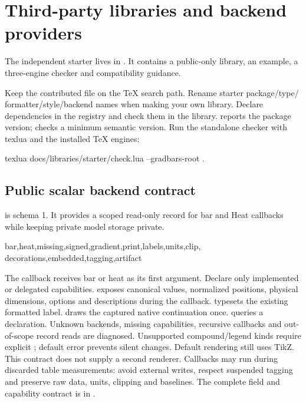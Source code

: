 \section{Third-party libraries and backend providers}
The independent starter lives in . It contains a
public-only library, an example, a three-engine checker and compatibility guidance.
\begin{source}
\usepackage[libraries=none]{gradbars}
\end{source}
Keep the contributed file on the TeX search path. Rename starter package/type/
formatter/style/backend names when making your own library. Declare dependencies
in the registry and check them in the library. \key{\gradbarsversion} reports the
package version;  checks a minimum semantic version.
Run the standalone checker with texlua and the installed TeX engines:
\begin{source}
texlua docs/libraries/starter/check.lua --gradbars-root .
\end{source}
\subsection{Public scalar backend contract}
\key{\gradbarsbackendversion} is schema 1. It provides a scoped read-only record
for bar and Heat callbacks while keeping private model storage private.
\begin{source}
 {bar,heat,missing,signed,gradient,print,labels,units,clip,
  decorations,embedded,tagging,artifact}
 {\gradbarsbackenddefault}
\end{source}
The callback receives bar or heat as its first argument. Declare only implemented
or delegated capabilities.  exposes canonical
values, normalized positions, physical dimensions, options and descriptions during
the callback. \key{\gradbarsbackendlabel} typesets the existing formatted label.
\key{\gradbarsbackenddefault} draws the captured native continuation once.
 queries a declaration.
Unknown backends, missing capabilities, recursive callbacks and out-of-scope
record reads are diagnosed. Unsupported compound/legend kinds require explicit
; default error prevents silent changes. Default
rendering still uses TikZ. This contract does not supply a second renderer.
Callbacks may run during discarded table measurements: avoid external writes,
respect suspended tagging and preserve raw data, units, clipping and baselines.
The complete field and capability contract is in .
